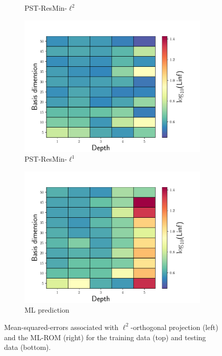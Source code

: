 \documentclass[3p,computermodern,10pt]{elsarticle}
\begin{document}
\begin{figure}
\begin{center}
\begin{subfigure}[t]{0.32\textwidth}
\caption{PST-ResMin-$\ell^2$}
\label{fig:burg_rom_results7}
\end{subfigure}
\begin{subfigure}[t]{0.32\textwidth}
\includegraphics[trim={0cm 0cm 0cm 0cm},clip,width=1.0\linewidth]{code/burgers/synapse_models/basis_study/results/Linf_L1.pdf}
\caption{PST-ResMin-$\ell^1$}
\label{fig:burg_rom_results8}
\end{subfigure}
\begin{subfigure}[t]{0.32\textwidth}
\includegraphics[trim={0cm 0cm 0cm 0cm},clip,width=1.0\linewidth]{code/burgers/synapse_models/basis_study/results/Linf_ML.pdf}
\caption{ML prediction}
\label{fig:burg_rom_results9}
\end{subfigure}

\caption{Mean-squared-errors associated with $\ell^2$-orthogonal projection (left) and the ML-ROM (right) for the training data (top) and testing data (bottom).}
\label{fig:burg_rom_results}
\end{center}
\end{figure}
\end{document}
